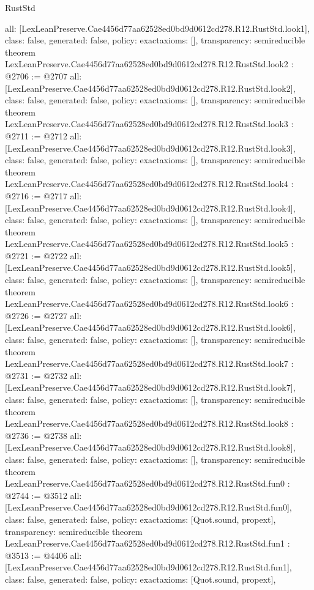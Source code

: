 \begin{lexlean}{RustStd}
\begin{coremodule}
{  all: [LexLeanPreserve.Cae4456d77aa62528ed0bd9d0612cd278.R12.RustStd.look1],
  class: false,
  generated: false,
  policy: exact{axioms: []},
  transparency: semireducible
}
theorem LexLeanPreserve.Cae4456d77aa62528ed0bd9d0612cd278.R12.RustStd.look2 : @2706 := @2707 {
  all: [LexLeanPreserve.Cae4456d77aa62528ed0bd9d0612cd278.R12.RustStd.look2],
  class: false,
  generated: false,
  policy: exact{axioms: []},
  transparency: semireducible
}
theorem LexLeanPreserve.Cae4456d77aa62528ed0bd9d0612cd278.R12.RustStd.look3 : @2711 := @2712 {
  all: [LexLeanPreserve.Cae4456d77aa62528ed0bd9d0612cd278.R12.RustStd.look3],
  class: false,
  generated: false,
  policy: exact{axioms: []},
  transparency: semireducible
}
theorem LexLeanPreserve.Cae4456d77aa62528ed0bd9d0612cd278.R12.RustStd.look4 : @2716 := @2717 {
  all: [LexLeanPreserve.Cae4456d77aa62528ed0bd9d0612cd278.R12.RustStd.look4],
  class: false,
  generated: false,
  policy: exact{axioms: []},
  transparency: semireducible
}
theorem LexLeanPreserve.Cae4456d77aa62528ed0bd9d0612cd278.R12.RustStd.look5 : @2721 := @2722 {
  all: [LexLeanPreserve.Cae4456d77aa62528ed0bd9d0612cd278.R12.RustStd.look5],
  class: false,
  generated: false,
  policy: exact{axioms: []},
  transparency: semireducible
}
theorem LexLeanPreserve.Cae4456d77aa62528ed0bd9d0612cd278.R12.RustStd.look6 : @2726 := @2727 {
  all: [LexLeanPreserve.Cae4456d77aa62528ed0bd9d0612cd278.R12.RustStd.look6],
  class: false,
  generated: false,
  policy: exact{axioms: []},
  transparency: semireducible
}
theorem LexLeanPreserve.Cae4456d77aa62528ed0bd9d0612cd278.R12.RustStd.look7 : @2731 := @2732 {
  all: [LexLeanPreserve.Cae4456d77aa62528ed0bd9d0612cd278.R12.RustStd.look7],
  class: false,
  generated: false,
  policy: exact{axioms: []},
  transparency: semireducible
}
theorem LexLeanPreserve.Cae4456d77aa62528ed0bd9d0612cd278.R12.RustStd.look8 : @2736 := @2738 {
  all: [LexLeanPreserve.Cae4456d77aa62528ed0bd9d0612cd278.R12.RustStd.look8],
  class: false,
  generated: false,
  policy: exact{axioms: []},
  transparency: semireducible
}
theorem LexLeanPreserve.Cae4456d77aa62528ed0bd9d0612cd278.R12.RustStd.fun0 : @2744 := @3512 {
  all: [LexLeanPreserve.Cae4456d77aa62528ed0bd9d0612cd278.R12.RustStd.fun0],
  class: false,
  generated: false,
  policy: exact{axioms: [Quot.sound, propext]},
  transparency: semireducible
}
theorem LexLeanPreserve.Cae4456d77aa62528ed0bd9d0612cd278.R12.RustStd.fun1 : @3513 := @4406 {
  all: [LexLeanPreserve.Cae4456d77aa62528ed0bd9d0612cd278.R12.RustStd.fun1],
  class: false,
  generated: false,
  policy: exact{axioms: [Quot.sound, propext]},
}
\end{coremodule}
\end{lexlean}
